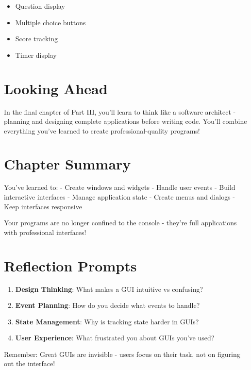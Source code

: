 \documentclass[
  letterpaper,
  DIV=11,
  numbers=noendperiod,
  oneside]{scrreprt}
\providecommand{\tightlist}{%
  \setlength{\itemsep}{0pt}\setlength{\parskip}{0pt}}\usepackage{longtable,booktabs,array}
\begin{document}
\begin{itemize}
\tightlist
\item
  Question display
\item
  Multiple choice buttons
\item
  Score tracking
\item
  Timer display
\end{itemize}

\section{Looking Ahead}\label{looking-ahead-2}

In the final chapter of Part III, you'll learn to think like a software
architect - planning and designing complete applications before writing
code. You'll combine everything you've learned to create
professional-quality programs!

\section{Chapter Summary}\label{chapter-summary-15}

You've learned to: - Create windows and widgets - Handle user events -
Build interactive interfaces - Manage application state - Create menus
and dialogs - Keep interfaces responsive

Your programs are no longer confined to the console - they're full
applications with professional interfaces!

\section{Reflection Prompts}\label{reflection-prompts-2}

\begin{enumerate}
\def\labelenumi{\arabic{enumi}.}
\tightlist
\item
  \textbf{Design Thinking}: What makes a GUI intuitive vs confusing?
\item
  \textbf{Event Planning}: How do you decide what events to handle?
\item
  \textbf{State Management}: Why is tracking state harder in GUIs?
\item
  \textbf{User Experience}: What frustrated you about GUIs you've used?
\end{enumerate}

Remember: Great GUIs are invisible - users focus on their task, not on
figuring out the interface!
\end{document}
